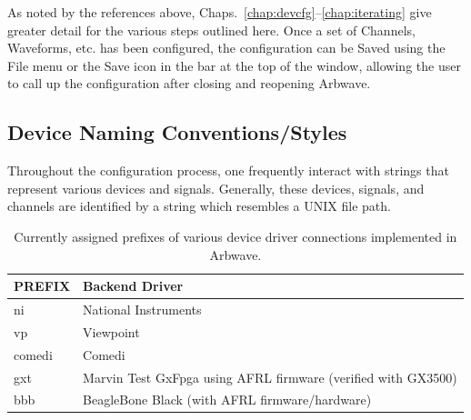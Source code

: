 %
As noted by the references above, Chaps.~\ref{chap:devcfg}--\ref{chap:iterating} 
give greater detail for the
various steps outlined here.  Once a set of Channels, Waveforms, etc. has been configured,
the configuration can be Saved using the File menu or the Save icon in the bar 
at the top of the window, allowing the user to call up the configuration after 
closing and reopening Arbwave.


\subsection{Device Naming Conventions/Styles}\label{sec:op-overview:naming}
Throughout the configuration process, one frequently interact with strings that
represent various devices and signals.  Generally, these devices, signals, and
channels are identified by a string which resembles a UNIX file path.

\begin{table}[b!]
  \begin{center}
    \begin{tabular}{|lR{12cm}|}
      \hline
      PREFIX & Backend Driver \\
      \hline
      \hline
      ni     & National Instruments \\
      vp     & Viewpoint \\
      comedi & Comedi \\
      gxt    & Marvin Test GxFpga using AFRL firmware (verified with GX3500) \\
      bbb    & BeagleBone Black (with AFRL firmware/hardware) \\
      \hline
    \end{tabular}
      \caption[Prefixes for device drivers]{\label{tab:prefixes}
        Currently assigned prefixes of various device driver connections
        implemented in Arbwave.
      }
  \end{center}
\end{table}

